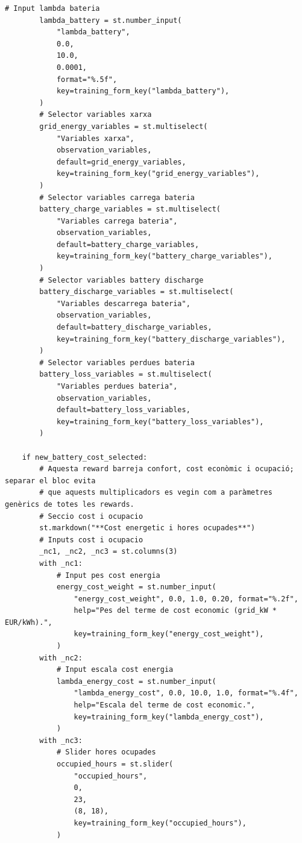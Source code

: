\documentclass[10pt,a4paper]{article}
\begin{document}
\begin{lstlisting}[style=studioPython,caption={page\_components/training\_rewards.py},label={lst:page-components-training-rewards-py}]
        # Input lambda bateria
        lambda_battery = st.number_input(
            "lambda_battery",
            0.0,
            10.0,
            0.0001,
            format="%.5f",
            key=training_form_key("lambda_battery"),
        )
        # Selector variables xarxa
        grid_energy_variables = st.multiselect(
            "Variables xarxa",
            observation_variables,
            default=grid_energy_variables,
            key=training_form_key("grid_energy_variables"),
        )
        # Selector variables carrega bateria
        battery_charge_variables = st.multiselect(
            "Variables carrega bateria",
            observation_variables,
            default=battery_charge_variables,
            key=training_form_key("battery_charge_variables"),
        )
        # Selector variables battery discharge
        battery_discharge_variables = st.multiselect(
            "Variables descarrega bateria",
            observation_variables,
            default=battery_discharge_variables,
            key=training_form_key("battery_discharge_variables"),
        )
        # Selector variables perdues bateria
        battery_loss_variables = st.multiselect(
            "Variables perdues bateria",
            observation_variables,
            default=battery_loss_variables,
            key=training_form_key("battery_loss_variables"),
        )

    if new_battery_cost_selected:
        # Aquesta reward barreja confort, cost econòmic i ocupació; separar el bloc evita
        # que aquests multiplicadors es vegin com a paràmetres genèrics de totes les rewards.
        # Seccio cost i ocupacio
        st.markdown("**Cost energetic i hores ocupades**")
        # Inputs cost i ocupacio
        _nc1, _nc2, _nc3 = st.columns(3)
        with _nc1:
            # Input pes cost energia
            energy_cost_weight = st.number_input(
                "energy_cost_weight", 0.0, 1.0, 0.20, format="%.2f",
                help="Pes del terme de cost economic (grid_kW * EUR/kWh).",
                key=training_form_key("energy_cost_weight"),
            )
        with _nc2:
            # Input escala cost energia
            lambda_energy_cost = st.number_input(
                "lambda_energy_cost", 0.0, 10.0, 1.0, format="%.4f",
                help="Escala del terme de cost economic.",
                key=training_form_key("lambda_energy_cost"),
            )
        with _nc3:
            # Slider hores ocupades
            occupied_hours = st.slider(
                "occupied_hours",
                0,
                23,
                (8, 18),
                key=training_form_key("occupied_hours"),
            )


\end{lstlisting}
\end{document}

